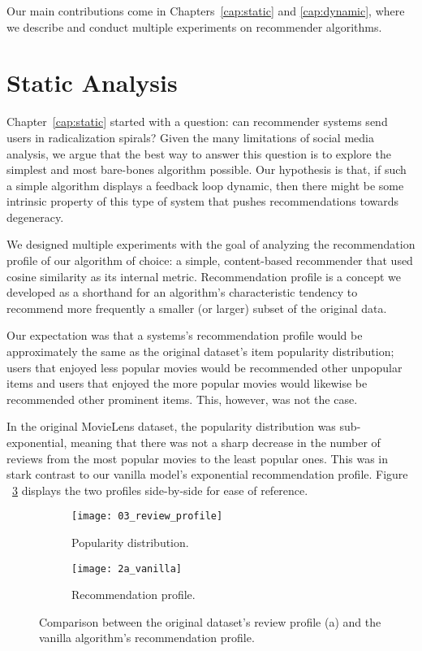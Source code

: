 Our main contributions come in Chapters~\ref{cap:static} and \ref{cap:dynamic},
where we describe and conduct multiple experiments on recommender algorithms.


\section{Static Analysis}
\label{sec:static}

Chapter~\ref{cap:static} started with a question: can recommender systems send
users in radicalization spirals? Given the many limitations of social media
analysis, we argue that the best way to answer this question is to explore the
simplest and most bare-bones algorithm possible. Our hypothesis is that, if such
a simple algorithm displays a feedback loop dynamic, then there might be some
intrinsic property of this type of system that pushes recommendations towards
degeneracy.

We designed multiple experiments with the goal of analyzing the recommendation
profile of our algorithm of choice: a simple, content-based recommender that
used cosine similarity as its internal metric. Recommendation profile is a
concept we developed as a shorthand for an algorithm's characteristic tendency
to recommend more frequently a smaller (or larger) subset of the original data.

Our expectation was that a systems's recommendation profile would be
approximately the same as the original dataset's item popularity distribution;
users that enjoyed less popular movies would be recommended other unpopular
items and users that enjoyed the more popular movies would likewise be
recommended other prominent items. This, however, was not the case.

In the original MovieLens \citep{harper_movielens_2015} dataset, the popularity
distribution was sub-exponential, meaning that there was not a sharp decrease in
the number of reviews from the most popular movies to the least popular ones.
This was in stark contrast to our vanilla model's exponential recommendation
profile. Figure ~\ref{fig:fig05_profile_comparison} displays the two profiles
side-by-side for ease of reference.

\begin{figure}
  \centering
  \begin{subfigure}{0.45\textwidth}
    \centering
    \texttt{[image: 03\_review\_profile]}
    \caption{Popularity distribution.\label{fig:fig05_review_profile}}
  \end{subfigure}
  \begin{subfigure}{0.45\textwidth}
    \centering
    \texttt{[image: 2a\_vanilla]}
    \caption{Recommendation profile.\label{fig:fig05_vanilla_profile}}
  \end{subfigure}
  \caption{Comparison between the original dataset's review profile (a) and the
  vanilla algorithm's recommendation
  profile.\label{fig:fig05_profile_comparison}}
\end{figure}

